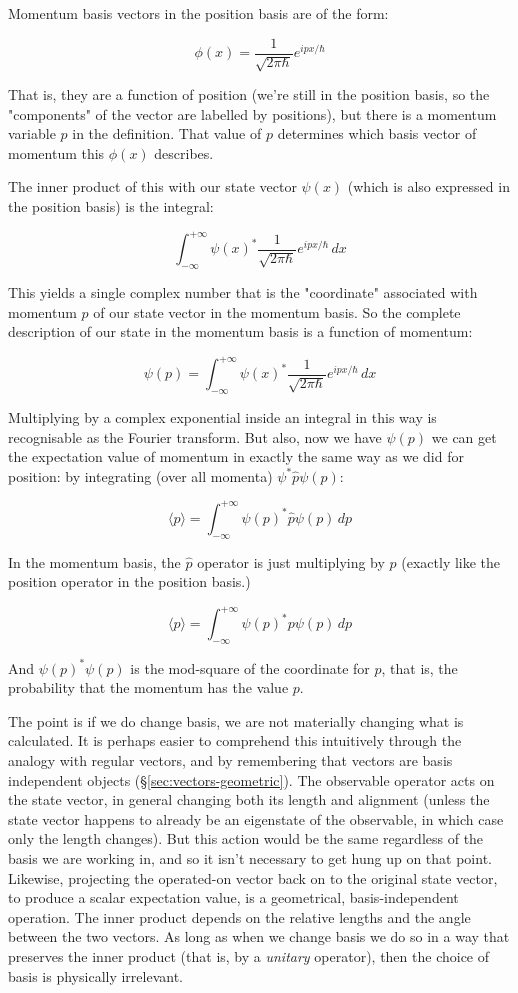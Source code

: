 Momentum basis vectors in the position basis are of the form:

$$
\phi(x) = \frac{1}{\sqrt{2\pi\hbar}}e^{ipx/\hbar}
$$

That is, they are a function of position (we're still in the position basis, so the "components" of the vector are labelled by positions), but there is a momentum variable $p$ in the definition. That value of $p$ determines which basis vector of momentum this $\phi(x)$ describes.

The inner product of this with our state vector $\psi(x)$ (which is also expressed in the position basis) is the integral:

$$
\int_{-\infty}^{+\infty}
\psi(x)^*
\frac{1}{\sqrt{2\pi\hbar}}e^{ipx/\hbar}
\,dx
$$

This yields a single complex number that is the "coordinate" associated with momentum $p$ of our state vector in the momentum basis. So the complete description of our state in the momentum basis is a function of momentum:

$$
\psi(p) = \int_{-\infty}^{+\infty}
\psi(x)^*
\frac{1}{\sqrt{2\pi\hbar}}e^{ipx/\hbar}
\,dx
$$

Multiplying by a complex exponential inside an integral in this way is recognisable as the Fourier transform. But also, now we have $\psi(p)$ we can get the expectation value of momentum in exactly the same way as we did for position: by integrating (over all momenta) $\psi^* \hat{p} \psi(p)$:

$$
\langle p \rangle =
\int_{-\infty}^{+\infty}
\psi(p)^*
\hat{p}
\psi(p)
\,dp
$$

In the momentum basis, the $\hat{p}$ operator is just multiplying by $p$ (exactly like the position operator in the position basis.)

$$
\langle p \rangle =
\int_{-\infty}^{+\infty}
\psi(p)^*
p
\psi(p)
\,dp
$$

And $\psi(p)^*\psi(p)$ is the mod-square of the coordinate for $p$, that is, the probability that the momentum has the value $p$. 

The point is if we do change basis, we are not materially changing what is calculated. It is perhaps easier to comprehend this intuitively through the analogy with regular vectors, and by remembering that vectors are basis independent objects (§\ref{sec:vectors-geometric}). The observable operator acts on the state vector, in general changing both its length and alignment (unless the state vector happens to already be an eigenstate of the observable, in which case only the length changes). But this action would be the same regardless of the basis we are working in, and so it isn't necessary to get hung up on that point. Likewise, projecting the operated-on vector back on to the original state vector, to produce a scalar expectation value, is a geometrical, basis-independent operation. The inner product depends on the relative lengths and the angle between the two vectors. As long as when we change basis we do so in a way that preserves the inner product (that is, by a \textit{unitary} operator), then the choice of basis is physically irrelevant. 

